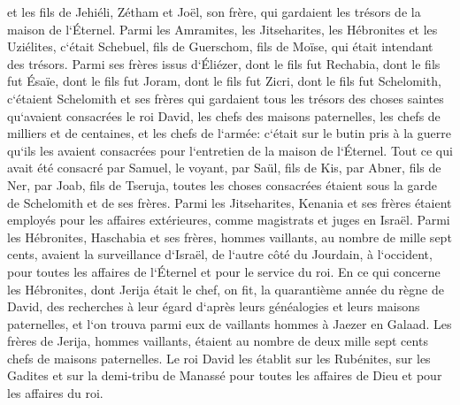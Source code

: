 \verse et les fils de Jehiéli, Zétham et Joël, son frère, qui gardaient les trésors de la maison de l`Éternel. 
\verse Parmi les Amramites, les Jitseharites, les Hébronites et les Uziélites, 
\verse c`était Schebuel, fils de Guerschom, fils de Moïse, qui était intendant des trésors. 
\verse Parmi ses frères issus d`Éliézer, dont le fils fut Rechabia, dont le fils fut Ésaïe, dont le fils fut Joram, dont le fils fut Zicri, dont le fils fut Schelomith, 
\verse c`étaient Schelomith et ses frères qui gardaient tous les trésors des choses saintes qu`avaient consacrées le roi David, les chefs des maisons paternelles, les chefs de milliers et de centaines, et les chefs de l`armée: 
\verse c`était sur le butin pris à la guerre qu`ils les avaient consacrées pour l`entretien de la maison de l`Éternel. 
\verse Tout ce qui avait été consacré par Samuel, le voyant, par Saül, fils de Kis, par Abner, fils de Ner, par Joab, fils de Tseruja, toutes les choses consacrées étaient sous la garde de Schelomith et de ses frères. 
\verse Parmi les Jitseharites, Kenania et ses frères étaient employés pour les affaires extérieures, comme magistrats et juges en Israël. 
\verse Parmi les Hébronites, Haschabia et ses frères, hommes vaillants, au nombre de mille sept cents, avaient la surveillance d`Israël, de l`autre côté du Jourdain, à l`occident, pour toutes les affaires de l`Éternel et pour le service du roi. 
\verse En ce qui concerne les Hébronites, dont Jerija était le chef, on fit, la quarantième année du règne de David, des recherches à leur égard d`après leurs généalogies et leurs maisons paternelles, et l`on trouva parmi eux de vaillants hommes à Jaezer en Galaad. 
\verse Les frères de Jerija, hommes vaillants, étaient au nombre de deux mille sept cents chefs de maisons paternelles. Le roi David les établit sur les Rubénites, sur les Gadites et sur la demi-tribu de Manassé pour toutes les affaires de Dieu et pour les affaires du roi. 

